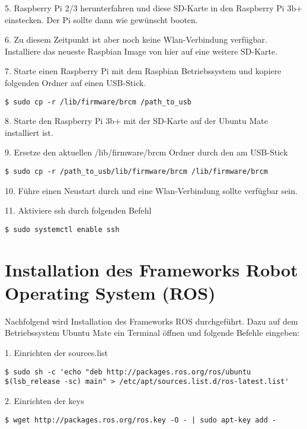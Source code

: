 5. Raspberry Pi 2/3 herunterfahren und diese SD-Karte in den Raspberry Pi 3b+ einstecken. Der Pi sollte dann wie gewünscht booten. 

6. Zu diesem Zeitpunkt ist aber noch keine Wlan-Verbindung verfügbar. Installiere das neueste Raspbian Image von hier auf eine weitere SD-Karte. 

7. Starte einen Raspberry Pi mit dem Raspbian Betriebssystem und kopiere folgenden Ordner auf einen USB-Stick. 

\begin{lstlisting}
$ sudo cp -r /lib/firmware/brcm /path_to_usb
\end{lstlisting}

8. Starte den Raspberry Pi 3b+ mit der SD-Karte auf der Ubuntu Mate installiert ist. 

9. Ersetze den aktuellen /lib/firmware/brcm Ordner durch den am USB-Stick

\begin{lstlisting}
$ sudo cp -r /path_to_usb/lib/firmware/brcm /lib/firmware/brcm
\end{lstlisting}

10. Führe einen Neustart durch und eine Wlan-Verbindung sollte verfügbar sein.

11. Aktiviere ssh durch folgenden Befehl

\begin{lstlisting}
$ sudo systemctl enable ssh
\end{lstlisting}


\section{Installation des Frameworks Robot Operating System (ROS)}

Nachfolgend wird Installation des Frameworks ROS durchgeführt. Dazu auf dem Betriebssystem Ubuntu Mate ein Terminal öffnen und folgende Befehle eingeben:

1. Einrichten der sources.list

\begin{lstlisting}
$ sudo sh -c 'echo "deb http://packages.ros.org/ros/ubuntu $(lsb_release -sc) main" > /etc/apt/sources.list.d/ros-latest.list'
\end{lstlisting}

2. Einrichten der keys

\begin{lstlisting}
$ wget http://packages.ros.org/ros.key -O - | sudo apt-key add -
\end{lstlisting}


